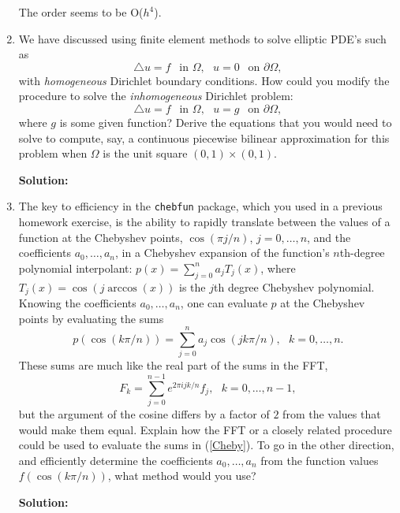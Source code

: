 \documentclass[letterpaper,12pt]{article}
\begin{document}
\begin{enumerate}
The order seems to be O($h^4$).
\item 

We have discussed using finite element methods to solve elliptic PDE's such as 
\[
\bigtriangleup u = f~~\mbox{ in } \Omega ,~~~u = 0~~\mbox{ on } \partial \Omega ,
\]
with {\em homogeneous} Dirichlet boundary conditions.  How could you modify the procedure
to solve the {\em inhomogeneous} Dirichlet problem:
\[
\bigtriangleup u = f~~\mbox{ in } \Omega ,~~~u = g~~\mbox{ on } \partial \Omega ,
\]
where $g$ is some given function?  Derive the equations that you would need to
solve to compute, say, a continuous piecewise bilinear approximation for this problem
when $\Omega$ is the unit square $(0,1) \times (0,1)$.

{\bf Solution:}

\item
The key to efficiency in the \verb+chebfun+ package, which you used in a previous homework
exercise, is the ability to rapidly translate between the values of a function at the
Chebyshev points, $\cos ( \pi j/n )$, $j=0, \ldots , n$, and the coefficients $a_0 , \ldots , a_n$,
in a Chebyshev expansion of the function's $n$th-degree polynomial interpolant:
$p(x) = \sum_{j=0}^n a_j T_j (x)$, where $T_j (x) = \cos ( j \arccos (x) )$ is the $j$th
degree Chebyshev polynomial.  Knowing the coefficients $a_0 , \ldots , a_n$, one can evaluate
$p$ at the Chebyshev points by evaluating the sums
\begin{equation}
p ( \cos ( k \pi / n ) ) = \sum_{j=0}^n a_j \cos ( j k \pi / n ) ,~~~k=0, \ldots , n.
\label{Cheby}
\end{equation}
These sums are much like the real part of the sums in the FFT,
\[
F_k = \sum_{j=0}^{n-1} e^{2 \pi i j k / n} f_j ,~~~k=0, \ldots , n-1 ,
\]
but the argument of the cosine differs by a factor of $2$ from the values that would make
them equal.  Explain how the FFT or a closely related procedure could be used to evaluate
the sums in (\ref{Cheby}).  To go in the other direction, and efficiently determine the coefficients
$a_0 , \ldots , a_n$ from the function values $f( \cos ( k \pi / n ) )$, what method would you use?


{\bf Solution:}


\end{enumerate}
\end{document}
